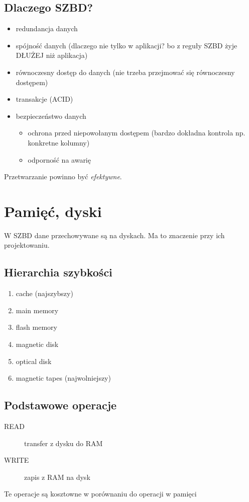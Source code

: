 \documentclass[12pt]{article}
\begin{document}
\subsection{Dlaczego \acs{SZBD}?}
\begin{itemize}
\item redundancja danych
\item spójność danych (dlaczego nie tylko w aplikacji? bo z reguły \ac{SZBD} żyje DŁUŻEJ niż aplikacja)
\item równoczesny dostęp do danych (nie trzeba przejmować się równoczesny dostępem)
\item transakcje (\ac{ACID})
\item bezpieczeństwo danych
\begin{itemize}
\item ochrona przed niepowołanym dostępem (bardzo dokładna kontrola np. konkretne kolumny)
\item odporność na awarię
\end{itemize}
\end{itemize}
Przetwarzanie powinno być \emph{efektywne}.

\section{Pamięć, dyski}
W \ac{SZBD} dane przechowywane są na dyskach. Ma to znaczenie przy ich projektowaniu.

\subsection{Hierarchia szybkości}
\begin{enumerate}
\item cache (najszybszy)
\item main memory
\item flash memory
\item magnetic disk
\item optical disk
\item magnetic tapes (najwolniejszy)
\end{enumerate}

\subsection{Podstawowe operacje}
\begin{description}
\item[READ] transfer z dysku do RAM
\item[WRITE] zapis z RAM na dysk
\end{description}
Te operacje są kosztowne w porównaniu do operacji w pamięci
\end{document}
